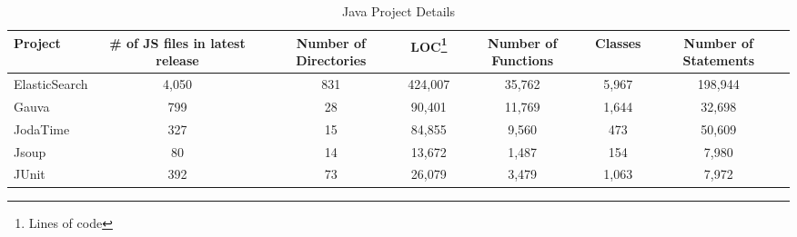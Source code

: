 \begin{table}[!tbh]
	\begin{center}
		\caption{Java Project Details }
		\label{tab:java_proj_details}
		\begin{tabular}{l| c c c c c c}
			\toprule
			\textbf{Project} & \textbf{\# of JS files in latest release} & \textbf{Number of Directories} & \textbf{LOC\footnote{Lines of code}} & \textbf{Number of Functions} & \textbf{Classes} & \textbf{Number of Statements} \\ 
			\midrule
			ElasticSearch    & 4,050                                     & 831                            & 424,007                              & 35,762                       & 5,967            & 198,944                       \\
			Gauva            & 799                                       & 28                             & 90,401                               & 11,769                       & 1,644            & 32,698                        \\
			JodaTime         & 327                                       & 15                             & 84,855                               & 9,560                        & 473              & 50,609                        \\
			Jsoup            & 80                                        & 14                             & 13,672                               & 1,487                        & 154              & 7,980                         \\
			JUnit            & 392                                       & 73                             & 26,079                               & 3,479                        & 1,063            & 7,972                         \\ 
			\bottomrule
		\end{tabular}
	\end{center}
\end{table}


